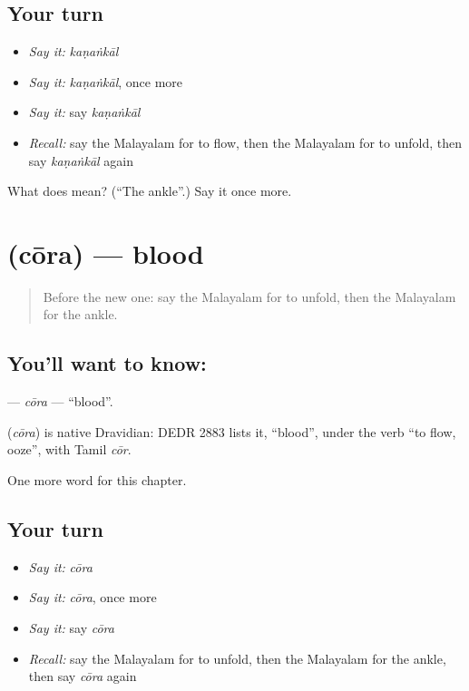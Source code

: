 \subsection*{Your turn}
\begin{itemize}
\raggedright
  \item \emph{Say it:} \emph{kaṇaṅkāl}
  \item \emph{Say it:} \emph{kaṇaṅkāl}, once more
  \item \emph{Say it:} say \emph{kaṇaṅkāl}
  \item \emph{Recall:} say the Malayalam for to flow, then the Malayalam for to unfold, then say \emph{kaṇaṅkāl} again
\end{itemize}

\begin{tcolorbox}[breakable,colback=teal!4,colframe=teal!35!black,title={Before you move on}]
What does  mean? (\textquotedblleft{}The ankle\textquotedblright{}.) Say it once more.
\end{tcolorbox}
\section[\texorpdfstring{\ml{ചോര} (cōra)}{ചോര (cōra)}]{ (cōra) — blood}

\label{lesson:ML-C233-cora}



\begin{quote}
Before the new one: say the Malayalam for to unfold, then the Malayalam for the ankle.
\end{quote}

\subsection*{You'll want to know: }
\textbf{} — \emph{cōra} — \textquotedblleft{}blood\textquotedblright{}.

\begin{cousinweb}
\textbf{} (\emph{cōra}) is native Dravidian: DEDR 2883 lists it, \textquotedblleft{}blood\textquotedblright{}, under the verb \textquotedblleft{}to flow, ooze\textquotedblright{}, with Tamil \emph{cōr}.
\end{cousinweb}

\begin{grammarlens}[title={What you've built}]
One more word for this chapter.
\end{grammarlens}

\subsection*{Your turn}
\begin{itemize}
\raggedright
  \item \emph{Say it:} \emph{cōra}
  \item \emph{Say it:} \emph{cōra}, once more
  \item \emph{Say it:} say \emph{cōra}
  \item \emph{Recall:} say the Malayalam for to unfold, then the Malayalam for the ankle, then say \emph{cōra} again
\end{itemize}

